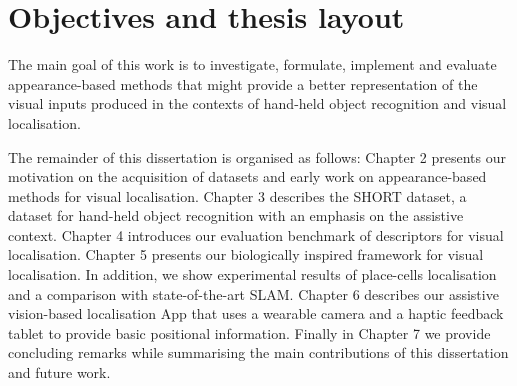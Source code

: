 \section{Objectives and thesis layout}

The main goal of this work is to investigate, formulate, implement and evaluate appearance-based methods that might provide a better representation of the visual inputs produced in the contexts of hand-held object recognition and visual localisation. 

The remainder of this dissertation is organised as follows: Chapter 2 presents our motivation on the acquisition of datasets and early work on appearance-based methods for visual localisation. Chapter 3 describes the SHORT dataset, a dataset for hand-held object recognition with an emphasis on the assistive context. Chapter 4 introduces our evaluation benchmark of descriptors for visual localisation. Chapter 5 presents our biologically inspired framework for visual localisation. In addition, we show experimental results of place-cells localisation  and a comparison with state-of-the-art SLAM. Chapter 6 describes our assistive vision-based localisation App that uses a wearable camera and a haptic feedback tablet to provide basic positional information. Finally in Chapter 7 we provide concluding remarks while summarising the main contributions of this dissertation and future work.


